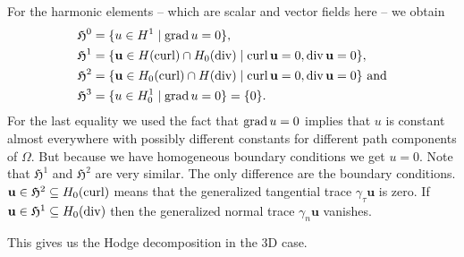 \documentclass[../main.tex]{subfiles}
\begin{document}
For the harmonic elements -- which are scalar and vector fields here -- 
we obtain
\begin{align*}
    \mathfrak{H}^0 &= \{ u \in H^1 \mid \operatorname{grad} u = 0\},
    \\ \mathfrak{H}^1 &= \{ \mathbf{u} \in H(\operatorname{curl}) \cap H_0(\operatorname{div})
        \mid \operatorname{curl} \mathbf{u} = 0, \operatorname{div} \mathbf{u} = 0\},
    \\ \mathfrak{H}^2 &= \{ \mathbf{u} \in H_0(\operatorname{curl}) \cap H(\operatorname{div})
        \mid \operatorname{curl} \mathbf{u} = 0, \operatorname{div} \mathbf{u} = 0\} \text{ and}
    \\ \mathfrak{H}^3 &= \{ u \in H^1_0
       \mid \operatorname{grad} u = 0\} = \{0\}.
\end{align*}
For the last equality we used the fact that $\operatorname{grad} u = 0$ implies that 
$u$ is constant almost everywhere with possibly different constants for 
different path components of $\Omega$. But because we have homogeneous boundary 
conditions we get $u=0$. Note that $\mathfrak{H}^1$ and $\mathfrak{H}^2$ 
are very similar. The only difference are the boundary conditions. 
$\mathbf{u} \in \mathfrak{H}^2 \subseteq H_0(\operatorname{curl})$ 
means that the generalized tangential 
trace $\gamma_\tau \mathbf{u}$ is zero. If $\mathbf{u}  \in \mathfrak{H}^1 
\subseteq H_0(\operatorname{div})$ 
then the 
generalized normal trace $\gamma_n \mathbf{u}$ vanishes.

This gives us the Hodge decomposition in the 3D case.
\end{document}
